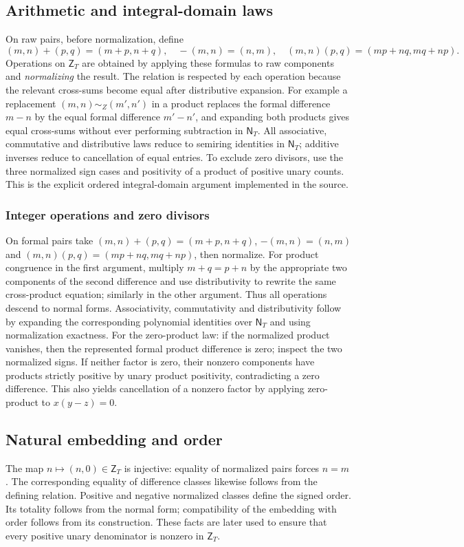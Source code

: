 \documentclass[11pt,reqno]{amsart}
\theoremstyle{definition}\newtheorem{definition}[theorem]{Definition}
\theoremstyle{remark}\newtheorem{remark}[theorem]{Remark}
\newcommand{\N}{\mathsf N_T}\newcommand{\Z}{\mathsf Z_T}\newcommand{\Q}{\mathsf Q_T}\newcommand{\RR}{\mathsf R}
\begin{document}
\subsection{Arithmetic and integral-domain laws}\label{main:sub-12}
On raw pairs, before normalization, define
\begin{equation}\label{eq:integerops}
(m,n)+(p,q)=(m+p,n+q),\quad -(m,n)=(n,m),\quad
(m,n)(p,q)=(mp+nq,mq+np).
\end{equation}
Operations on $\Z$ are obtained by applying these formulas to raw components and \emph{normalizing} the result. The relation is respected by each operation because the relevant cross-sums become equal after distributive expansion. For example a replacement $(m,n)\sim_Z(m',n')$ in a product replaces the formal difference $m-n$ by the equal formal difference $m'-n'$, and expanding both products gives equal cross-sums without ever performing subtraction in $\N$. All associative, commutative and distributive laws reduce to semiring identities in $\N$; additive inverses reduce to cancellation of equal entries. To exclude zero divisors, use the three normalized sign cases and positivity of a product of positive unary counts. This is the explicit ordered integral-domain argument implemented in the source.

\medskip
\subsubsection*{Integer operations and zero divisors}\label{supp:5-3}
On formal pairs take $(m,n)+(p,q)=(m+p,n+q)$, $-(m,n)=(n,m)$ and $(m,n)(p,q)=(mp+nq,mq+np)$, then normalize. For product congruence in the first argument, multiply $m+q=p+n$ by the appropriate two components of the second difference and use distributivity to rewrite the same cross-product equation; similarly in the other argument. Thus all operations descend to normal forms. Associativity, commutativity and distributivity follow by expanding the corresponding polynomial identities over $\N$ and using normalization exactness. For the zero-product law: if the normalized product vanishes, then the represented formal product difference is zero; inspect the two normalized signs. If neither factor is zero, their nonzero components have products strictly positive by unary product positivity, contradicting a zero difference. This also yields cancellation of a nonzero factor by applying zero-product to $x(y-z)=0$.
\medskip

\subsection{Natural embedding and order}\label{main:sub-13}
The map $n\mapsto(n,0)\in\Z$ is injective: equality of normalized pairs forces $n=m$. The corresponding equality of difference classes likewise follows from the defining relation. Positive and negative normalized classes define the signed order. Its totality follows from the normal form; compatibility of the embedding with order follows from its construction. These facts are later used to ensure that every positive unary denominator is nonzero in $\Z$.
\end{document}
